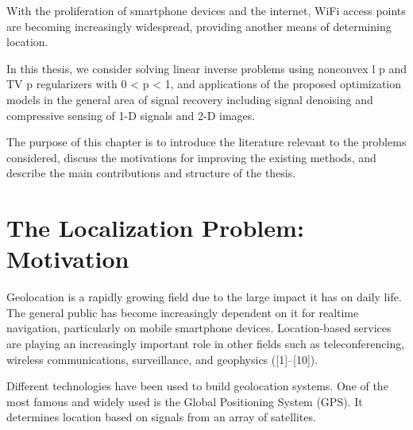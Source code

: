 \label{chapter:introduction}




With the proliferation of smartphone devices and the internet,
WiFi access points are becoming increasingly widespread, 
providing another means of determining location.

In this thesis, we consider solving linear inverse problems using nonconvex l p and TV p
regularizers with 0 < p < 1, and applications of the proposed optimization models in
the general area of signal recovery including signal denoising and compressive sensing
of 1-D signals and 2-D images. 

The purpose of this chapter is to introduce the
literature relevant to the problems considered, discuss the motivations for improving
the existing methods, and describe the main contributions and structure of the thesis.

\section{The Localization Problem: Motivation} \label{problem}

Geolocation is a rapidly growing field due to the large impact it has on daily life.  The general public has become increasingly dependent on it for realtime navigation, particularly on mobile smartphone devices. Location-based services are  playing an increasingly important role in other fields such as teleconferencing, wireless communications, surveillance, and geophysics \cite{SmithAbel, ShcauRob, Yao, Huang, CheungChan, LiHu, Cheung, Sayed, classMDS} ([1]–[10]).

Different technologies have been used to build geolocation systems. One of the most famous and widely used is the Global
Positioning System (GPS). It determines location based on signals from an array of satellites.


